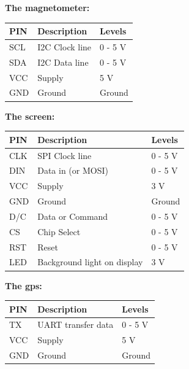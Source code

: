 \textbf{The magnetometer:}\\
\begin{table}[H]
\centering
    \begin{tabular}{|l|l|l|}
    \hline
    PIN & Description    & Levels  \\ \hline
    SCL & I2C Clock line & 0 - 5 V \\ \hline
    SDA & I2C Data line  & 0 - 5 V \\ \hline
    VCC & Supply         & 5 V     \\ \hline
    GND & Ground         & Ground  \\ \hline
    \end{tabular}
\end{table}

\textbf{The screen:}\\
\begin{table}[H]
\centering
    \begin{tabular}{|l|l|l|}
    \hline
    PIN & Description    & Levels  \\ \hline
    CLK & SPI Clock line & 0 - 5 V \\ \hline
    DIN & Data in (or MOSI)  & 0 - 5 V \\ \hline
    VCC & Supply         & 3 V     \\ \hline
    GND & Ground         & Ground  \\ \hline
    D/C & Data or Command & 0 - 5 V \\ \hline
    CS  & Chip Select    & 0 - 5 V \\ \hline
    RST & Reset			 & 0 - 5 V \\ \hline
    LED & Background light on display & 3 V \\ \hline
    \end{tabular}
\end{table}

\textbf{The gps:}\\
\begin{table}[H]
\centering
    \begin{tabular}{|l|l|l|}
    \hline
    PIN & Description    & Levels  \\ \hline
    TX & UART transfer data  & 0 - 5 V \\ \hline
    VCC & Supply         & 5 V     \\ \hline
    GND & Ground         & Ground  \\ \hline
    \end{tabular}
\end{table}